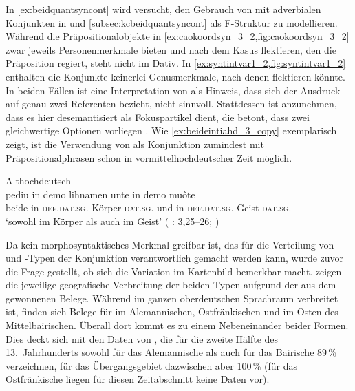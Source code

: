 In \cref{ex:beidquantsyncont} wird versucht, den Gebrauch von  mit
adverbialen Konjunkten in  und
\ref{subsec:kcbeidquantsyncont} als F-Struktur zu modellieren. Während die
Präpositionalobjekte in \cref{ex:caokoordsyn_3_2,fig:caokoordsyn_3_2} zwar
jeweils Personenmerkmale bieten und nach dem Kasus flektieren, den die
Präposition regiert, steht  nicht im Dativ. In
\cref{ex:syntintvar1_2,fig:syntintvar1_2} enthalten die Konjunkte keinerlei
Genusmerkmale, nach denen  flektieren könnte. In beiden Fällen ist
eine Interpretation von  als Hinweis, dass sich der Ausdruck auf
genau zwei Referenten bezieht, nicht sinnvoll. Stattdessen ist anzunehmen, dass
es hier desemantisiert als Fokuspartikel dient, die betont, dass zwei
gleichwertige Optionen vorliegen \autocite[425--428]{johannessen2005}. Wie
\cref{ex:beideintiahd_3_copy} exemplarisch zeigt, ist die Verwendung von
 als Konjunktion zumindest mit Präpositionalphrasen schon in
vormittelhochdeutscher Zeit möglich.

\begin{exe}
\ex \label{ex:beideintiahd_3_copy}
	Althochdeutsch\\
	\gll pediu in demo lihnamen unte in demo muôte \\
		beide in \textsc{def.dat.sg.\MascI} Körper-\textsc{dat.sg.\MascI} und in
			\textsc{def.dat.sg.\MascI} Geist-\textsc{dat.sg.\MascI} \\
	\trans `sowohl im Körper als auch im Geist'
		(%
			: 3,25--26;
			\cite[171]{steinmeyer1916}%
		)
\end{exe}

Da kein morphosyntaktisches Merkmal greifbar ist, das für die Verteilung von
- und -Typen der Konjunktion verantwortlich gemacht
werden kann, wurde zuvor die Frage gestellt, ob sich die Variation im
Kartenbild bemerkbar macht.
 zeigen die jeweilige
geografische Verbreitung der beiden Typen aufgrund der aus dem \CAO{} gewonnenen
Belege. Während  im ganzen oberdeutschen Sprachraum verbreitet
ist, finden sich Belege für  im Alemannischen, Ostfränkischen und
im Osten des Mittelbairischen. Überall dort kommt es zu einem Nebeneinander
beider Formen. Dies deckt sich mit den Daten von \citet[627]{ksw2}, die für die
zweite Hälfte des 13.~Jahrhunderts sowohl für das Alemannische als auch für das
Bairische 89\,\%  verzeichnen, für das Übergangsgebiet dazwischen
aber 100\,\% (für das Ostfränkische liegen für diesen Zeitabschnitt keine Daten
vor).

